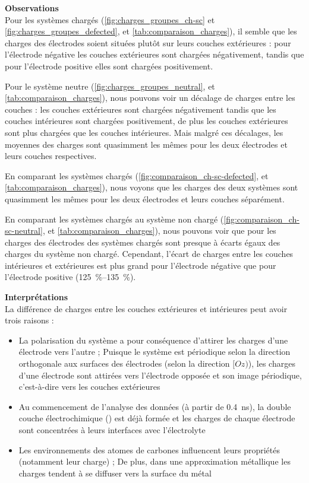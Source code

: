 \clearpage

\textbf{Observations}\\
Pour les systèmes chargés (\autoref{fig:charges_groupes_ch-sc} et \ref{fig:charges_groupes_defected}, et \autoref{tab:comparaison_charges}), il semble que les charges des électrodes soient situées plutôt sur leurs couches extérieures : pour l'électrode négative les couches extérieures sont chargées négativement, tandis que pour l'électrode positive elles sont chargées positivement.

Pour le système neutre (\autoref{fig:charges_groupes_neutral}, et \autoref{tab:comparaison_charges}), nous pouvons voir un décalage de charges entre les couches : les couches extérieures sont chargées négativement tandis que les couches intérieures sont chargées positivement, de plus les couches extérieures sont plus chargées que les couches intérieures. Mais malgré ces décalages, les moyennes des charges sont quasimment les mêmes pour les deux électrodes et leurs couches respectives.

En comparant les systèmes chargés (\autoref{fig:comparaison_ch-sc-defected}, et \autoref{tab:comparaison_charges}), nous voyons que les charges des deux systèmes sont quasimment les mêmes pour les deux électrodes et leurs couches séparément.

En comparant les systèmes chargés au système non chargé (\autoref{fig:comparaison_ch-sc-neutral}, et \autoref{tab:comparaison_charges}), nous pouvons voir que pour les charges des électrodes des systèmes chargés sont presque à écarts égaux des charges du système non chargé. Cependant, l'écart de charges entre les couches intérieures et extérieures est plus grand pour l'électrode négative que pour l'électrode positive (\qtyrange[range-units = single]{125}{135}{\percent}).

\textbf{Interprétations}\\
La différence de charges entre les couches extérieures et intérieures peut avoir trois raisons :
\begin{itemize}
    \item La polarisation du système a pour conséquence d'attirer les charges d'une électrode vers l'autre ; Puisque le système est périodique selon la direction orthogonale aux surfaces des électrodes (selon la direction $[Oz)$), les charges d'une électrode sont attirées vers l'électrode opposée et son image périodique, c'est-à-dire vers les couches extérieures
    \item Au commencement de l'analyse des données (à partir de \qty{0.4}{\nano \second}), la double couche électrochimique (\edl{}) est déjà formée et les charges de chaque électrode sont concentrées à leurs interfaces avec l'électrolyte
    \item Les environnements des atomes de carbones influencent leurs propriétés (notamment leur charge) ; De plus, dans une approximation métallique les charges tendent à se diffuser vers la surface du métal
\end{itemize}

